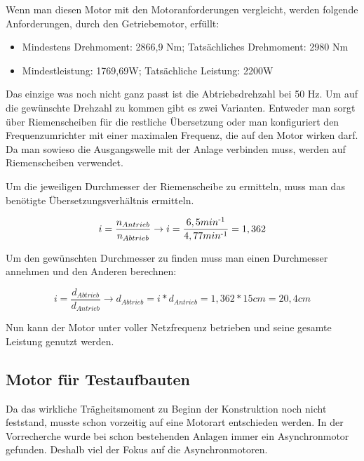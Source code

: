 \documentclass[12pt]{scrreprt} %
\begin{document}
Wenn man diesen Motor mit den Motoranforderungen vergleicht, werden folgende Anforderungen, durch den Getriebemotor, erfüllt:

\begin{itemize}
	\item{Mindestens Drehmoment: 2866,9 Nm; Tatsächliches Drehmoment: 2980 Nm}
	\item{Mindestleistung: 1769,69W; Tatsächliche Leistung: 2200W}
\end{itemize}

Das einzige was noch nicht ganz passt ist die Abtriebsdrehzahl bei 50 Hz. Um auf die gewünschte Drehzahl zu kommen gibt es zwei Varianten. Entweder man sorgt über Riemenscheiben für die restliche Übersetzung oder man konfiguriert den Frequenzumrichter mit einer maximalen Frequenz, die auf den Motor wirken darf. \\

Da man sowieso die Ausgangswelle mit der Anlage verbinden muss, werden auf Riemenscheiben verwendet.

Um die jeweiligen Durchmesser der Riemenscheibe zu ermitteln, muss man das benötigte Übersetzungsverhältnis ermitteln.

\begin{center}
\begin{equation}
  \label{eq:5}
	i=  \frac{n_{Antrieb}}{n_{Abtrieb}} \rightarrow i = \frac{6,5 min\textsuperscript{-1}}{4,77 min\textsuperscript{-1}} = 1,362
\end{equation} 
\end{center}

Um den gewünschten Durchmesser zu finden muss man einen Durchmesser annehmen und den Anderen berechnen:

\begin{center}
\begin{equation}
  \label{eq:6}
	i=  \frac{d_{Abtrieb}}{d_{Antrieb}} \rightarrow d_{Abtrieb} = i * d_{Antrieb} =  1,362 * 15 cm = 20,4cm
\end{equation} 
\end{center}

Nun kann der Motor unter voller Netzfrequenz betrieben und seine gesamte Leistung genutzt werden. 

\subsection{Motor für Testaufbauten}
\label{sec:motorFuerTestaufbauten}

Da das wirkliche Trägheitsmoment zu Beginn der Konstruktion noch nicht feststand, musste schon vorzeitig auf eine Motorart entschieden werden. In der Vorrecherche wurde bei schon bestehenden Anlagen immer ein Asynchronmotor gefunden. Deshalb viel der Fokus auf die Asynchronmotoren.
\newpage
\end{document}
